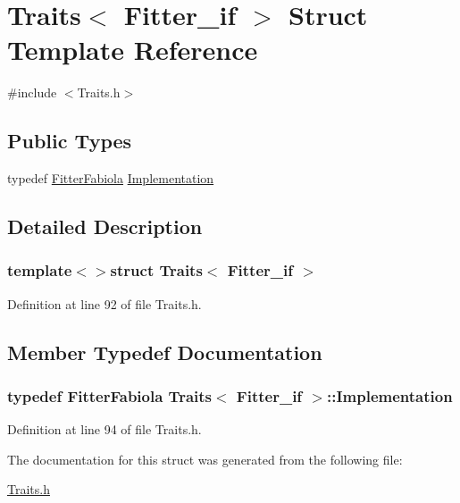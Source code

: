 \hypertarget{struct_traits_3_01_fitter__if_01_4}{\section{Traits$<$ Fitter\-\_\-if $>$ Struct Template Reference}
\label{struct_traits_3_01_fitter__if_01_4}
}


{\ttfamily \#include $<$Traits.\-h$>$}

\subsection*{Public Types}
\begin{DoxyCompactItemize}
\item 
typedef \hyperlink{class_fitter_fabiola}{Fitter\-Fabiola} \hyperlink{struct_traits_3_01_fitter__if_01_4_a38788fe142507eb739104de1b4b75eb4}{Implementation}
\end{DoxyCompactItemize}


\subsection{Detailed Description}
\subsubsection*{template$<$$>$struct Traits$<$ Fitter\-\_\-if $>$}



Definition at line 92 of file Traits.\-h.



\subsection{Member Typedef Documentation}
\hypertarget{struct_traits_3_01_fitter__if_01_4_a38788fe142507eb739104de1b4b75eb4}{
\subsubsection[{Implementation}]{\setlength{\rightskip}{0pt plus 5cm}typedef {\bf Fitter\-Fabiola} {\bf Traits}$<$ {\bf Fitter\-\_\-if} $>$\-::{\bf Implementation}}}\label{struct_traits_3_01_fitter__if_01_4_a38788fe142507eb739104de1b4b75eb4}


Definition at line 94 of file Traits.\-h.



The documentation for this struct was generated from the following file\-:\begin{DoxyCompactItemize}
\item 
\hyperlink{_traits_8h}{Traits.\-h}\end{DoxyCompactItemize}
